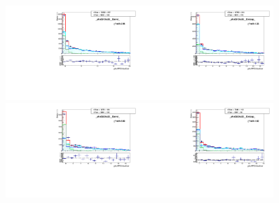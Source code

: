 \begin{figure}[htb]
  \begin{center}
   \includegraphics[width=0.45\textwidth]{../figs/figs_v11/ELECTRON_WGamma/TemplateFits/c_TEMPL_CHISO_UNblind__phoEt15to20__Barrel__RooFit_MCclosure.pdf}\includegraphics[width=0.45\textwidth]{../figs/figs_v11/ELECTRON_WGamma/TemplateFits/c_TEMPL_CHISO_UNblind__phoEt15to20__Endcap__RooFit_MCclosure.pdf}\\
   \includegraphics[width=0.45\textwidth]{../figs/figs_v11/ELECTRON_WGamma/TemplateFits/c_TEMPL_CHISO_UNblind__phoEt20to25__Barrel__RooFit_MCclosure.pdf}\includegraphics[width=0.45\textwidth]{../figs/figs_v11/ELECTRON_WGamma/TemplateFits/c_TEMPL_CHISO_UNblind__phoEt20to25__Endcap__RooFit_MCclosure.pdf}\\

\end{center}
\end{figure}
